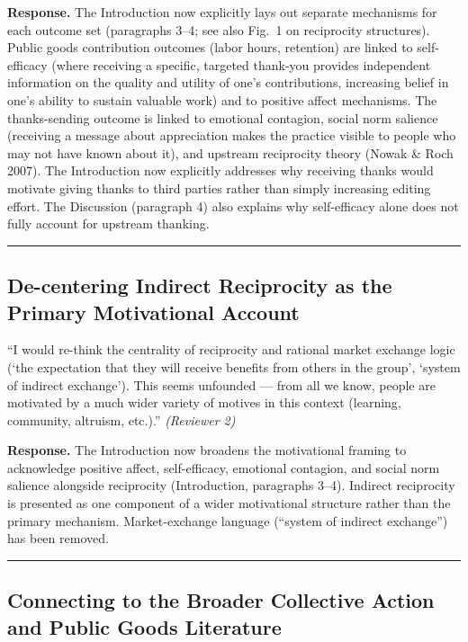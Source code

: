 \documentclass[12pt]{article}
\newenvironment{reviewquote}{%
  \def\FrameCommand{{\color{quotebarcolor}\vrule width 2pt}\colorbox{quotebg}}%
  \MakeFramed{\advance\hsize-\width \FrameRestore}%
  \small
}{%
  \endMakeFramed
}
\begin{document}
\textbf{Response.} The Introduction now explicitly lays out separate mechanisms for each outcome set (paragraphs 3--4; see also Fig.\ 1 on reciprocity structures). Public goods contribution outcomes (labor hours, retention) are linked to self-efficacy (where receiving a specific, targeted thank-you provides independent information on the quality and utility of one's contributions, increasing belief in one's ability to sustain valuable work) and to positive affect mechanisms. The thanks-sending outcome is linked to emotional contagion, social norm salience (receiving a message about appreciation makes the practice visible to people who may not have known about it), and upstream reciprocity theory (Nowak \& Roch 2007). The Introduction now explicitly addresses why receiving thanks would motivate giving thanks to third parties rather than simply increasing editing effort. The Discussion (paragraph 4) also explains why self-efficacy alone does not fully account for upstream thanking.

\bigskip\hrule\bigskip

\subsection{De-centering Indirect Reciprocity as the Primary Motivational Account}

\begin{reviewquote}
``I would re-think the centrality of reciprocity and rational market exchange logic (`the expectation that they will receive benefits from others in the group', `system of indirect exchange'). This seems unfounded --- from all we know, people are motivated by a much wider variety of motives in this context (learning, community, altruism, etc.).'' \textit{(Reviewer 2)}
\end{reviewquote}

\textbf{Response.} The Introduction now broadens the motivational framing to acknowledge positive affect, self-efficacy, emotional contagion, and social norm salience alongside reciprocity (Introduction, paragraphs 3--4). Indirect reciprocity is presented as one component of a wider motivational structure rather than the primary mechanism. Market-exchange language (``system of indirect exchange'') has been removed.

\bigskip\hrule\bigskip

\subsection{Connecting to the Broader Collective Action and Public Goods Literature}
\end{document}
